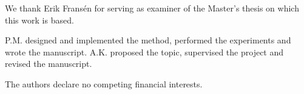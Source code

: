 \begin{acknowledgements}
We thank Erik Fransén for serving as examiner of the Master's thesis on which this work is based.
\end{acknowledgements}

\begin{contributions}
P.M. designed and implemented the method, performed the experiments and wrote the manuscript.
A.K. proposed the topic, supervised the project and revised the manuscript.
\end{contributions}

\begin{interests}
The authors declare no competing financial interests.
\end{interests}
